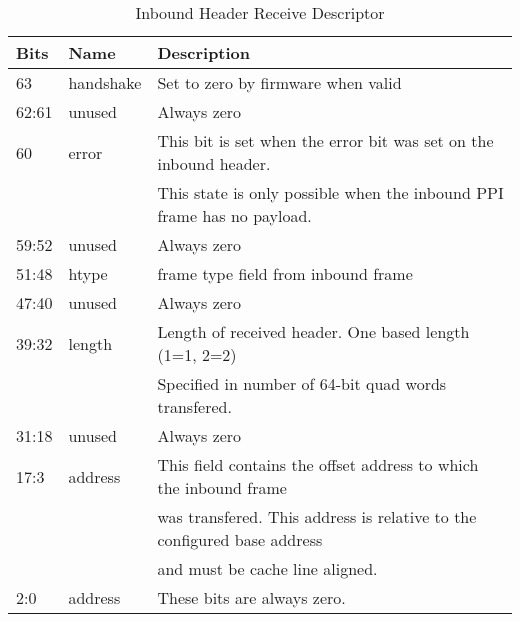 \documentclass[11pt]{article}
\begin{document}
\begin{table}[H]
\small
\centering
   \begin{tabular}{| l | l | l | } 
      \hline \textbf{Bits} & \textbf{Name} & \textbf{Description} \\
      \hline 63            & handshake     & Set to zero by firmware when valid     \\
      \hline 62:61         & unused        & Always zero                                                            \\ 
      \hline 60            & error         & This bit is set when the error bit was set on the inbound header.      \\
                           &               & This state is only possible when the inbound PPI frame has no payload. \\
      \hline 59:52         & unused        & Always zero                                                       \\
      \hline 51:48         & htype         & frame type field from inbound frame                                    \\
      \hline 47:40         & unused        & Always zero                                                       \\
      \hline 39:32         & length        & Length of received header. One based length (1=1, 2=2)                 \\
                           &               & Specified in number of 64-bit quad words transfered.                   \\
      \hline 31:18         & unused        & Always zero                                                       \\
      \hline 17:3          & address       & This field contains the offset address to which the inbound frame \\
                           &               & was transfered. This address is relative to the configured base address \\
                           &               & and must be cache line aligned.                                         \\
      \hline 2:0           & address       & These bits are always zero.                                                \\
      \hline
   \end{tabular}
   \caption{Inbound Header Receive Descriptor}
   \label{tab:ib_rx_desc}
\end{table}
\end{document}
